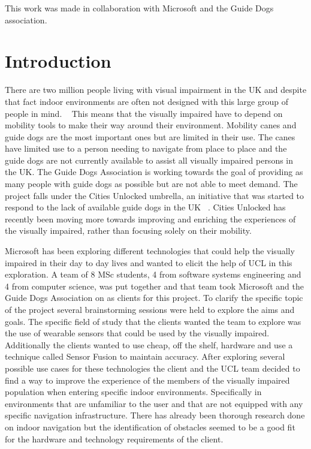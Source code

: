 \documentclass[prodmode,acmtecs]{acmsmall} %
\begin{document}


\begin{bottomstuff}
This work was made in collaboration with Microsoft and the Guide Dogs association.
\end{bottomstuff}

\maketitle

\section{Introduction}
There are two million people living with visual impairment in the UK and despite that fact indoor environments are often not designed with this large group of people in mind. ~\cite{NHSBlindStatistics} This means that the visually impaired have to depend on mobility tools to make their way around their environment. Mobility canes and guide dogs are the most important ones but are limited in their use. The canes have limited use to a person needing to navigate from place to place and the guide dogs are not currently available to assist all visually impaired persons in the UK. The Guide Dogs Association is working towards the goal of providing as many people with guide dogs as possible but are not able to meet demand. The project falls under the Cities Unlocked umbrella, an initiative that was started to respond to the lack of available guide dogs in the UK ~\cite{CitiesUnlockedGeneral}. Cities Unlocked has recently been moving more towards improving and enriching the experiences of the visually impaired, rather than focusing solely on their mobility.

Microsoft has been exploring different technologies that could help the visually impaired in their day to day lives and wanted to elicit the help of UCL in this exploration. A team of 8 MSc students, 4 from software systems engineering and 4 from computer science, was put together and that team took Microsoft and the Guide Dogs Association on as clients for this project. To clarify the specific topic of the project several brainstorming sessions were held to explore the aims and goals. The specific field of study that the clients wanted the team to explore was the use of wearable sensors that could be used by the visually impaired. Additionally the clients wanted to use cheap, off the shelf, hardware and use a technique called Sensor Fusion to maintain accuracy.
After exploring several possible use cases for these technologies the client and the UCL team decided to find a way to improve the experience of the members of the visually impaired population when entering specific indoor environments.
Specifically in environments that are unfamiliar to the user and that are not equipped with any specific navigation infrastructure. There has already been thorough research done on indoor navigation but the identification of obstacles seemed to be a good fit for the hardware and technology requirements of the client.
\end{document}
